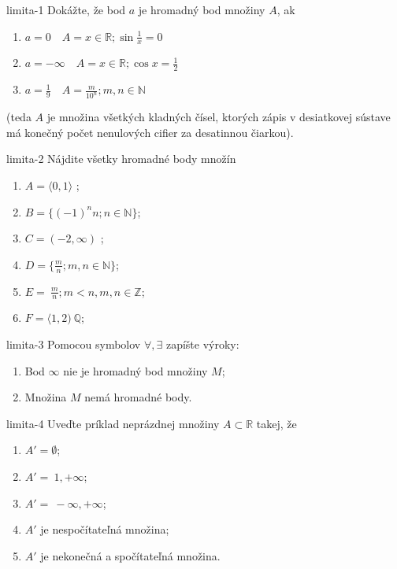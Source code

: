 \begin{defproblem}{limita-1}
Dokážte, že bod $a$ je hromadný bod množiny $A$, ak
	
\begin{enumerate}
	\item $a=0 \quad A={x \in \mathbb{R}; \sin{\frac{1}{x}} = 0}$
	\item $a=-\infty \quad A={x \in \mathbb{R}; \cos{x} = \frac{1}{2}}$ 
	\item $a=\frac{1}{9} \quad A={\frac{m}{10^n}; m,n \in \mathbb{N}}$
\end{enumerate}
	
(teda $A$ je množina všetkých kladných čísel, ktorých zápis v desiatkovej sústave má konečný počet nenulových cifier za desatinnou čiarkou).
	
\end{defproblem}

\begin{defproblem}{limita-2}
Nájdite všetky hromadné body množín
\begin{enumerate}
\item $A= \langle 0,1 \rangle$ ;
\item $B= \{ (-1)^n n; n\in \mathbb{N} \} $;
\item $C= (-2,\infty)$ ;
\item $D= \{\frac{m}{n}; m,n \in \mathbb{N} \}$;
\item $E= {\ \frac{m}{n}; m<n,m,n \in \mathbb{Z}}$;
\item $F= \langle 1,2 ) \ \mathbb{Q}$;
\end{enumerate}
\end{defproblem}

\begin{defproblem}{limita-3}
Pomocou symbolov $\forall,\exists$ zapíšte výroky:
\begin{enumerate}
\item Bod $\infty$ nie je hromadný bod množiny $M$;
\item Množina $M$ nemá hromadné body.
\end{enumerate}
\end{defproblem}

\begin{defproblem}{limita-4}
Uveďte príklad neprázdnej množiny $A \subset \mathbb{R}$ takej, že
\begin{enumerate}
\item $A'=\emptyset$;
\item $A'={\ 1, +\infty}$;
\item $A'={\ -\infty,+\infty}$;
\item $A'$ je nespočítateľná množina;
\item $A'$ je nekonečná a spočítateľná množina.
\end{enumerate}
\end{defproblem}

